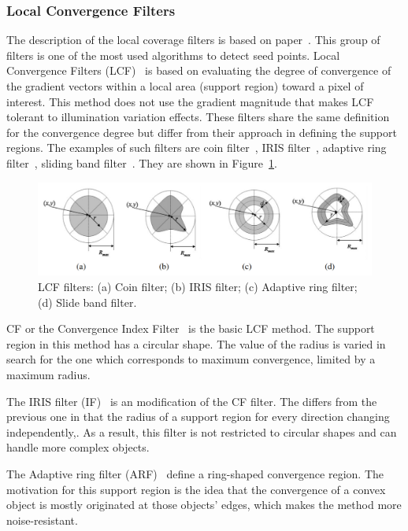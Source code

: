 \documentclass{lutmscthesis}[2010/09/22]
\begin{document}
\subsubsection{Local Convergence Filters}
The description of the local coverage filters is based on paper~\cite{LCF}.
This group of filters is one of the most used algorithms to detect seed points. Local Convergence Filters (LCF)~\cite{LCF} is based on evaluating the degree of convergence of the gradient
vectors within a local area (support region) toward a pixel of
interest. This method does not use the gradient magnitude that makes LCF tolerant to illumination variation effects.
These filters share the same
definition for the convergence degree but differ from their approach in defining the support
regions. The examples of such filters are coin filter~\cite{LCF_CF}, IRIS filter~\cite{LCF_CF}, adaptive ring filter~\cite{LCF-ARF}, sliding band filter~\cite{LCF-SBF}. They are shown in Figure~\ref{fig:LCF-alg}.

\begin{figure}[ht]
  \includegraphics[width=\linewidth]{LCF.png}
  \caption{LCF filters: (a) Coin filter; (b) IRIS filter; (c) Adaptive ring filter; (d) Slide band filter.~\cite{LCF}}
  \label{fig:LCF-alg}
\end{figure}


CF or the Convergence Index Filter~\cite{LCF_CF} is the basic LCF method. The support region in this method has a circular shape. The value of the radius is varied in search for the one which
corresponds to maximum convergence, limited by a maximum
radius. 

The IRIS filter (IF)~\cite{LCF_CF} is an modification of the CF filter. The differs from the previous one in that the radius of a support region for every direction changing independently,. As a result, this filter is not restricted to circular shapes and can handle more complex objects. 


The Adaptive ring filter (ARF)~\cite{LCF-ARF} define a ring-shaped convergence region. The motivation for this support
region is the idea that the convergence of a convex
object is mostly originated at those objects’ edges, which makes the method more noise-resistant.
\end{document}
